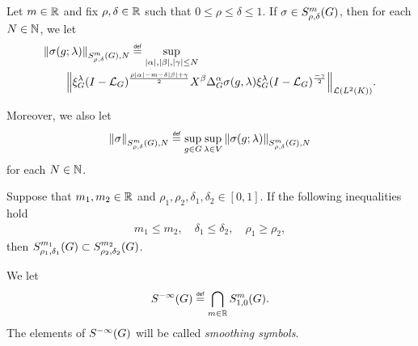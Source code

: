 \begin{definition}
    Let $m \in \mathbb{R}$ and fix $\rho, \delta \in \mathbb{R}$ such that $0 \leq \rho \leq \delta \leq 1$.
    If $\sigma \in S^{m}_{\rho, \delta}(G)$,
    then for each $N \in \mathbb{N}$,
    we let
    \begin{align*}
        &\SymbolSemiNorm m {\rho, \delta} N {\sigma(g; \lambda)}
        \defeq
        \sup_{\abs \alpha, \abs \beta, \abs \gamma \leq N}
        \\
        &\qquad
        \norm [\Lin{\Lebesgue 2 \CompactGroup}] {%
            \Rep{\lambda} \BesselPotential{\rho \abs\alpha - m - \delta \abs\beta + \gamma} \LeftDifferentialOperator{\beta} \DifferenceOperatorOrder{\alpha} \sigma(g, \lambda) \Rep{\lambda} \BesselPotential{-\gamma}
        }.
    \end{align*}

    Moreover, we also let
    \begin{align*}
        \SymbolSemiNorm m {\rho, \delta} N \sigma
        \defeq \sup_{g \in \Group} \sup_{\lambda \in \VectorSpace}
        \SymbolSemiNorm m {\rho, \delta} N {\sigma(g; \lambda)}
    \end{align*}
    for each $N \in \mathbb{N}$.
\end{definition}

\begin{lemma}
    Suppose that $m_1, m_2 \in \mathbb{R}$ and $\rho_1, \rho_2, \delta_1, \delta_2 \in [0, 1]$.
    If the following inequalities hold
    \begin{align*}
        m_1 \leq m_2, \quad \delta_1 \leq \delta_2, \quad \rho_1 \geq \rho_2,
    \end{align*}
    then $S^{m_1}_{\rho_1, \delta_1}(G) \subset S^{m_2}_{\rho_2, \delta_2}(G)$.
\end{lemma}

\begin{definition}
\label{definition:smoothing_symbols}
    We let
    \begin{align*}
        \SmoothingSymbols \defeq \bigcap_{m \in \R} \SymbolClass{m}{1, 0}.
    \end{align*}
    The elements of ${S^{-\infty} (G)}$ will be called \emph{smoothing symbols}.
\end{definition}

